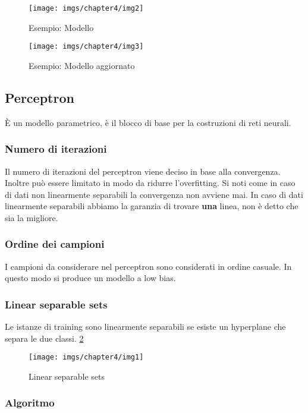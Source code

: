 	\begin{figure}
		\centering
		\begin{minipage}{.5\textwidth}
			\centering
			\texttt{[image: imgs/chapter4/img2]}
			\caption{Esempio: Modello}
			\label{fig:chapter04-02}
		\end{minipage}%
		\begin{minipage}{.5\textwidth}
			\centering
			\texttt{[image: imgs/chapter4/img3]}
			\caption{Esempio: Modello aggiornato}
			\label{fig:chapter04-03}
		\end{minipage}
	\end{figure}
	
	\subsection{Perceptron}
	\`E un modello parametrico, \`e il blocco di base per la costruzioni di reti neurali.
		\subsubsection{Numero di iterazioni}
		Il numero di iterazioni del perceptron viene deciso in base alla convergenza.
		Inoltre pu\`o essere limitato in modo da ridurre l'overfitting.
		Si noti come in caso di dati non linearmente separabili la convergenza non avviene mai. 
		In caso di dati linearmente separabili abbiamo la garanzia di trovare \textbf{una} linea, non è detto che sia la migliore.
		
		\subsubsection{Ordine dei campioni}
		I campioni da considerare nel perceptron sono considerati in ordine casuale.
		In questo modo si produce un modello a low bias.
		
		\subsubsection{Linear separable sets}
		Le istanze di training sono linearmente separabili se esiste un hyperplane che separa le due classi. \ref{fig:chapter04-01}
		\begin{figure}
			\centering
			\texttt{[image: imgs/chapter4/img1]}
			\caption{Linear separable sets}
			\label{fig:chapter04-01}
		\end{figure}
		
		\subsubsection{Algoritmo}
		
		

